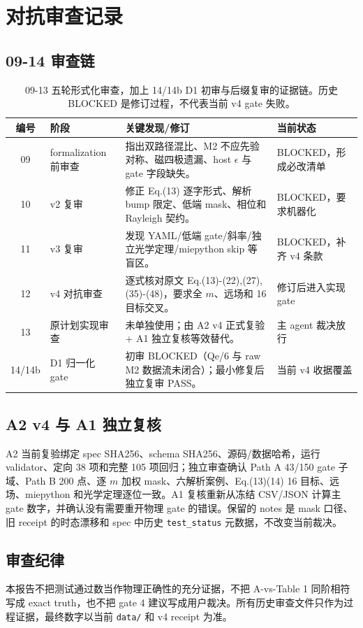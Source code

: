 \section{对抗审查记录}

\subsection{09-14 审查链}

\begin{table}[H]
\centering\scriptsize
\begin{tabularx}{\textwidth}{c l X l}
\toprule
编号 & 阶段 & 关键发现/修订 & 当前状态 \\
\midrule
09 & formalization 前审查 & 指出双路径混比、M2 不应先验对称、磁四极遗漏、host $\epsilon$ 与 gate 字段缺失。 & BLOCKED，形成必改清单 \\
10 & v2 复审 & 修正 Eq.(13) 逐字形式、解析 bump 限定、低端 mask、相位和 Rayleigh 契约。 & BLOCKED，要求机器化 \\
11 & v3 复审 & 发现 YAML/低端 gate/斜率/独立光学定理/miepython skip 等盲区。 & BLOCKED，补齐 v4 条款 \\
12 & v4 对抗审查 & 逐式核对原文 Eq.(13)-(22),(27),(35)-(48)，要求全 $m$、远场和 16 目标交叉。 & 修订后进入实现 gate \\
13 & 原计划实现审查 & 未单独使用；由 A2 v4 正式复验 + A1 独立复核等效替代。 & 主 agent 裁决放行 \\
14/14b & D1 归一化 gate & 初审 BLOCKED（Qe/6 与 raw M2 数据流未闭合）；最小修复后独立复审 PASS。 & 当前 v4 收据覆盖 \\
\bottomrule
\end{tabularx}
\caption{09-13 五轮形式化审查，加上 14/14b D1 初审与后缀复审的证据链。历史 BLOCKED 是修订过程，不代表当前 v4 gate 失败。}
\end{table}

\subsection{A2 v4 与 A1 独立复核}

A2 当前复验绑定 spec SHA256、schema SHA256、源码/数据哈希，运行 validator、定向 38 项和完整 105 项回归；独立审查确认 Path A 43/150 gate 子域、Path B 200 点、逐 $m$ 加权 mask、六解析案例、Eq.(13)(14) 16 目标、远场、miepython 和光学定理逐位一致。A1 复核重新从冻结 CSV/JSON 计算主 gate 数字，并确认没有需要重开物理 gate 的错误。保留的 notes 是 mask 口径、旧 receipt 的时态漂移和 spec 中历史 \texttt{test\_status} 元数据，不改变当前裁决。

\subsection{审查纪律}

本报告不把测试通过数当作物理正确性的充分证据，不把 A-vs-Table 1 同阶相符写成 exact truth，也不把 gate 4 建议写成用户裁决。所有历史审查文件只作为过程证据，最终数字以当前 \texttt{data/} 和 v4 receipt 为准。
